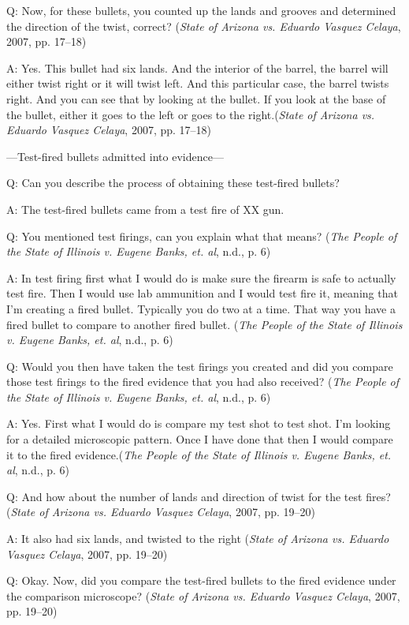 \documentclass[print]{nuthesis}
\begin{document}
Q: Now, for these bullets, you counted up the lands and grooves and determined the direction of the twist, correct? (\emph{State of {Arizona} vs. Eduardo {Vasquez} {Celaya}}, 2007, pp. 17--18)

A: Yes. This bullet had six lands. And the interior of the barrel, the barrel will either twist right or it will twist left.
And this particular case, the barrel twists right.
And you can see that by looking at the bullet.
If you look at the base of the bullet, either it goes to the left or goes to the right.(\emph{State of {Arizona} vs. Eduardo {Vasquez} {Celaya}}, 2007, pp. 17--18)

---Test-fired bullets admitted into evidence---

Q: Can you describe the process of obtaining these test-fired bullets?

A: The test-fired bullets came from a test fire of XX gun.

Q: You mentioned test firings, can you explain what that means? (\emph{The {People} of the {State} of {Illinois} v. Eugene {Banks}, et. al}, n.d., p. 6)

A: In test firing first what I would do is make sure the firearm is safe to actually test fire.
Then I would use lab ammunition and I would test fire it, meaning that I'm creating a fired bullet.
Typically you do two at a time.
That way you have a fired bullet to compare to another fired bullet. (\emph{The {People} of the {State} of {Illinois} v. Eugene {Banks}, et. al}, n.d., p. 6)

Q: Would you then have taken the test firings you created and did you compare those test firings to the fired evidence that you had also received? (\emph{The {People} of the {State} of {Illinois} v. Eugene {Banks}, et. al}, n.d., p. 6)

A: Yes. First what I would do is compare my test shot to test shot.
I'm looking for a detailed microscopic pattern.
Once I have done that then I would compare it to the fired evidence.(\emph{The {People} of the {State} of {Illinois} v. Eugene {Banks}, et. al}, n.d., p. 6)

Q: And how about the number of lands and direction of twist for the test fires? (\emph{State of {Arizona} vs. Eduardo {Vasquez} {Celaya}}, 2007, pp. 19--20)

A: It also had six lands, and twisted to the right (\emph{State of {Arizona} vs. Eduardo {Vasquez} {Celaya}}, 2007, pp. 19--20)

Q: Okay. Now, did you compare the test-fired bullets to the fired evidence under the comparison microscope? (\emph{State of {Arizona} vs. Eduardo {Vasquez} {Celaya}}, 2007, pp. 19--20)
\end{document}
